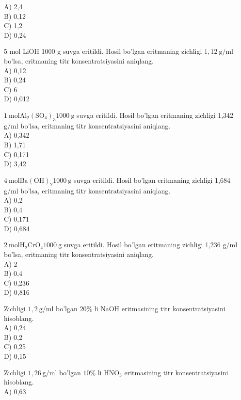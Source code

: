 A) 2,4\\
B) 0,12\\
C) 1,2\\
D) 0,24
  \item 5 mol LiOH 1000 g suvga eritildi. Hosil bo'lgan eritmaning zichligi $1,12 \mathrm{~g} / \mathrm{ml}$ bo'lsa, eritmaning titr konsentratsiyasini aniqlang.\\
A) 0,12\\
B) 0,24\\
C) 6\\
D) 0,012
  \item $1 \mathrm{~mol} \mathrm{Al}_{2}\left(\mathrm{SO}_{4}\right)_{3} 1000 \mathrm{~g}$ suvga eritildi. Hosil bo'lgan eritmaning zichligi 1,342 $\mathrm{g} / \mathrm{ml}$ bo'lsa, eritmaning titr konsentratsiyasini aniqlang.\\
A) 0,342\\
B) 1,71\\
C) 0,171\\
D) 3,42
  \item $4 \mathrm{~mol} \mathrm{Ba}(\mathrm{OH})_{2} 1000 \mathrm{~g}$ suvga eritildi. Hosil bo'lgan eritmaning zichligi 1,684\\
g/ml bo'lsa, eritmaning titr konsentratsiyasini aniqlang.\\
A) 0,2\\
B) 0,4\\
C) 0,171\\
D) 0,684
  \item $2 \mathrm{~mol} \mathrm{H}_{2} \mathrm{CrO}_{4} 1000 \mathrm{~g}$ suvga eritildi. Hosil bo'lgan eritmaning zichligi 1,236 $\mathrm{g} / \mathrm{ml}$ bo'lsa, eritmaning titr konsentratsiyasini aniqlang.\\
A) 2\\
B) 0,4\\
C) 0,236\\
D) 0,816
  \item Zichligi $1,2 \mathrm{~g} / \mathrm{ml}$ bo'lgan $20 \%$ li NaOH eritmasining titr konsentratsiyasini hisoblang.\\
A) 0,24\\
B) 0,2\\
C) 0,25\\
D) 0,15\\
  \item Zichligi $1,26 \mathrm{~g} / \mathrm{ml}$ bo'lgan $10 \%$ li $\mathrm{HNO}_{3}$ eritmasining titr konsentratsiyasini hisoblang.\\
A) 0,63\\

